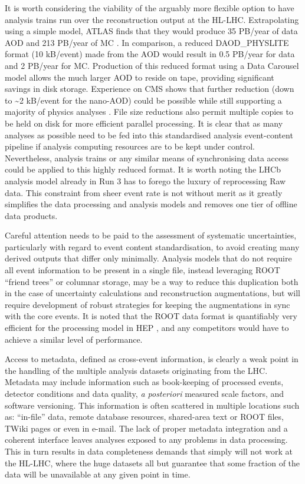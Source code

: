 \documentclass[11pt,a4paper]{article}
\begin{document}
It is worth considering the viability of the arguably more flexible
option to have analysis trains run over the reconstruction output at the
HL-LHC. Extrapolating using a simple model, ATLAS finds that they would
produce 35 PB/year of data AOD and 213 PB/year of MC \cite{Ref1}. In
comparison, a reduced DAOD\_PHYSLITE format (10 kB/event) made from the AOD would
result in 0.5 PB/year for data and 2 PB/year for MC. Production of this
reduced format using a Data Carousel model \cite{Ref1} allows the much
larger AOD to reside on tape, providing significant savings in disk
storage. Experience on CMS shows that further reduction (down to
\textasciitilde2 kB/event for the nano-AOD) could be possible while
still supporting a majority of physics analyses \cite{Ref5}. File size
reductions also permit multiple copies to be held on disk for more
efficient parallel processing. It is clear that as many analyses as
possible need to be fed into this standardised analysis event-content
pipeline if analysis computing resources are to be kept under control.
Nevertheless, analysis trains or any similar means of synchronising data
access could be applied to this highly reduced format. It is worth
noting the LHCb analysis model already in Run 3 has to forego the luxury
of reprocessing Raw data. This constraint from sheer event rate is not
without merit as it greatly simplifies the data processing and analysis
models and removes one tier of offline data products.

Careful attention needs to be paid to the assessment of systematic
uncertainties, particularly with regard to event content
standardisation, to avoid creating many derived outputs that differ only
minimally. Analysis models that do not require all event information to
be present in a single file, instead leveraging ROOT ``friend trees'' or
columnar storage, may be a way to reduce this duplication both in the
case of uncertainty calculations and reconstruction augmentations, but
will require development of robust strategies for keeping the
augmentations in sync with the core events. It is noted that the ROOT
data format is quantifiably very efficient for the processing model in
HEP \cite{Ref16}, and any competitors would have to achieve a similar level
of performance.

Access to metadata, defined as cross-event information, is clearly a
weak point in the handling of the multiple analysis datasets originating
from the LHC. Metadata may include information such as book-keeping of
processed events, detector conditions and data quality, \emph{a
posteriori} measured scale factors, and software versioning. This
information is often scattered in multiple locations such as:
``in-file'' data, remote database resources, shared-area text or ROOT files,
TWiki pages or even in e-mail. The lack of proper metadata integration
and a coherent interface leaves analyses exposed to any problems in data
processing. This in turn results in data completeness demands that
simply will not work at the HL-LHC, where the huge datasets all but
guarantee that some fraction of the data will be unavailable at any
given point in time.
\end{document}

